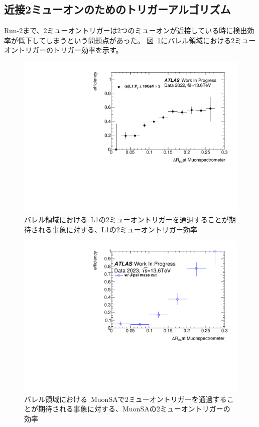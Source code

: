 \subsection{近接2ミューオンのためのトリガーアルゴリズム}\label{chapter3-3-1}
Run-2まで、2ミューオントリガーは2つのミューオンが近接している時に検出効率が低下してしまうという問題点があった。
図~\ref{fig:3-12}にバレル領域における2ミューオントリガーのトリガー効率を示す。

\begin{figure}[H]
    \centering
    \includegraphics[clip, width=13cm]{fig/3/L1_2MU10_eff.pdf}
    \caption{バレル領域における~L1の2ミューオントリガーを通過することが期待される事象に対する、L1の2ミューオントリガー効率}
    \label{fig:3-12}
\end{figure}

\begin{figure}[H]
    \centering
    \includegraphics[clip, width=13cm]{fig/3/2mu14_Eff_data.pdf}
    \caption{バレル領域における~MuonSAで2ミューオントリガーを通過することが期待される事象に対する、MuonSAの2ミューオントリガーの効率}
    \label{fig:3-13}
\end{figure}

